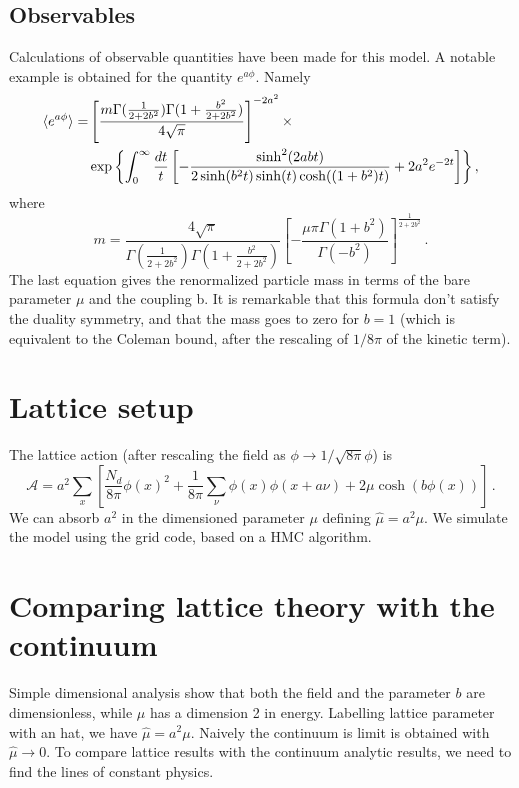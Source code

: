 \documentclass[12pt,a4paper]{report}
\begin{document}
\section{Observables}
Calculations of observable quantities have been made for this model.   A notable example is obtained for the quantity $e^{a\phi}$. Namely
\begin{align}
\braket{e^{a \phi}} =  &\left[ \dfrac{m\Gamma(\frac{1}{2+2b^2}) \Gamma(1+ \frac{b^2}{2+2b^2}) }{4 \sqrt{\pi}}  \right]^{-2 a^2} \times  \\ & \exp{\left\lbrace \int_0^\infty \dfrac{dt}{t} \left[ - \dfrac{\sinh^2(2 a b t)}{2 \sinh(b^2t) \sinh(t)\cosh((1+b^2)t) } + 2 a^2 e^{-2t} \right]  \right\rbrace } \nonumber \,,
\end{align} where \begin{equation}
\label{eq:mass_continuum}
m = \dfrac{4 \sqrt{\pi}}{\Gamma(\frac{1}{2+2b^2})\Gamma(1 +\frac{b^2}{2+2b^2}) } \left[ - \dfrac{\mu \pi \Gamma(1+b^2)}{\Gamma(-b^2)} \right]^{\frac{1}{2+2b^2}} \,.
\end{equation} The last equation gives the renormalized particle mass in terms of the bare parameter $\mu$ and the coupling b. It is remarkable that this formula don't satisfy the duality symmetry, and that the mass goes to zero for $b=1$ (which is equivalent to the Coleman bound, after the rescaling of $1/8\pi$ of the kinetic term).

\chapter{Lattice setup}

The lattice action (after rescaling the field as $\phi \to 1/\sqrt{8 \pi} \phi $) is \begin{equation}
\mathcal{A} = a^2 \sum_x \left[ \dfrac{N_d}{8 \pi} \phi(x)^2 + \dfrac{1}{8\pi} \sum_\nu \phi(x) \phi(x+ a \nu) +2  \mu \cosh(b\phi(x)) \right] \,.
\end{equation} We can absorb $a^2$ in the dimensioned parameter $\mu$ defining $\hat \mu = a^2 \mu$. We simulate the model using the grid code, based on a HMC algorithm.  


\chapter{Comparing lattice theory with the continuum }

Simple dimensional analysis show that both the field and the parameter $b$ are dimensionless, while $\mu$ has a dimension 2 in energy. Labelling lattice parameter with an hat, we have $\hat \mu = a^2 \mu$. Naively the continuum is limit is obtained  with $\hat \mu \to 0$. To compare lattice results with the continuum analytic results, we need to find the lines of constant physics.
\end{document}

